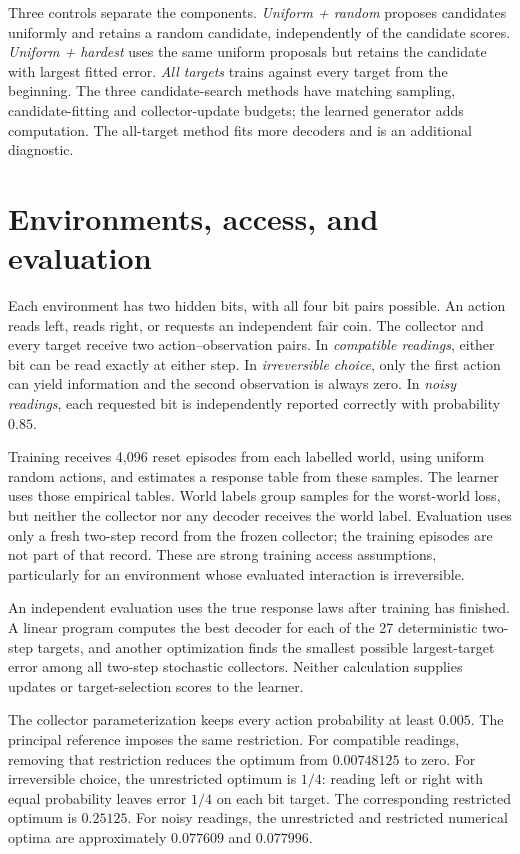 \documentclass[11pt]{article}
\begin{document}
Three controls separate the components. \emph{Uniform + random} proposes
candidates uniformly and retains a random candidate, independently of the
candidate scores. \emph{Uniform + hardest} uses the same uniform proposals but
retains the candidate with largest fitted error. \emph{All targets} trains
against every target from the beginning. The three candidate-search methods
have matching sampling, candidate-fitting and collector-update budgets; the
learned generator adds computation. The all-target method fits more decoders
and is an additional diagnostic.

\section{Environments, access, and evaluation}

Each environment has two hidden bits, with all four bit pairs possible. An
action reads left, reads right, or requests an independent fair coin. The
collector and every target receive two action--observation pairs. In
\emph{compatible readings}, either bit can be read exactly at either step. In
\emph{irreversible choice}, only the first action can yield information and the
second observation is always zero. In \emph{noisy readings}, each requested bit
is independently reported correctly with probability $0.85$.

Training receives 4,096 reset episodes from each labelled world, using uniform
random actions, and estimates a response table from these samples. The learner
uses those empirical tables. World labels group samples for the worst-world
loss, but neither the collector nor any decoder receives the world label.
Evaluation uses only a fresh two-step record from the frozen collector; the
training episodes are not part of that record. These are strong training access
assumptions, particularly for an environment whose evaluated interaction is
irreversible.

An independent evaluation uses the true response laws after training has
finished. A linear program computes the best decoder for each of the 27
deterministic two-step targets, and another optimization finds the smallest
possible largest-target error among all two-step stochastic collectors. Neither
calculation supplies updates or target-selection scores to the learner.

The collector parameterization keeps every action probability at least $0.005$.
The principal reference imposes the same restriction. For compatible readings,
removing that restriction reduces the optimum from $0.00748125$ to zero. For
irreversible choice, the unrestricted optimum is $1/4$: reading left or right
with equal probability leaves error $1/4$ on each bit target. The corresponding
restricted optimum is $0.25125$. For noisy readings, the unrestricted and
restricted numerical optima are approximately $0.077609$ and $0.077996$.
\end{document}
